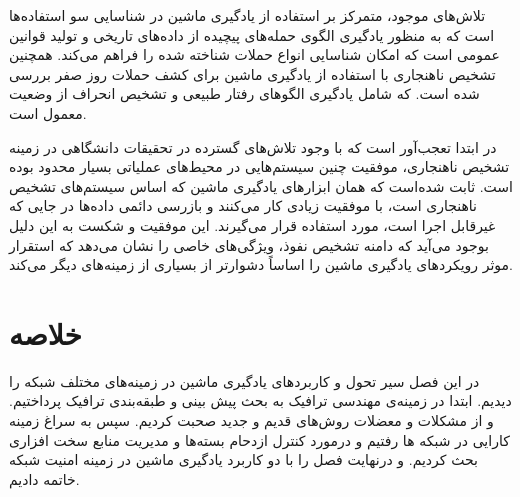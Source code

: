 تلاش‌های موجود، متمرکز بر استفاده از یادگیری ماشین در شناسایی سو استفاده‌ها است که به منظور یادگیری الگوی حمله‌های پیچیده از داده‌های تاریخی و تولید قوانین عمومی است که امکان شناسایی انواع حملات شناخته شده را فراهم می‌کند. همچنین تشخیص ناهنجاری با استفاده از یادگیری ماشین برای کشف حملات روز صفر بررسی شده است. که شامل یادگیری الگوهای رفتار طبیعی و تشخیص انحراف از وضعیت معمول است\cite{ayoubi2018machine}.


در ابتدا تعجب‌آور است که با وجود تلاش‌های گسترده در تحقیقات دانشگاهی در زمینه تشخیص ناهنجاری، موفقیت چنین سیستم‌هایی در محیط‌های عملیاتی بسیار محدود بوده است. ثابت شده‌است که همان ابزارهای یادگیری ماشین که اساس سیستم‌های تشخیص ناهنجاری است، با موفقیت زیادی کار می‌کنند و بازرسی دائمی داده‌ها در جایی که غیرقابل اجرا است، مورد استفاده قرار می‌گیرند. این موفقیت و شکست به این دلیل بوجود می‌آید که دامنه تشخیص نفوذ، ویژگی‌های خاصی را نشان می‌دهد که استقرار موثر رویکردهای یادگیری ماشین را اساساً دشوارتر از بسیاری از زمینه‌های دیگر می‌کند\cite{sommer2010outside}.


\section{خلاصه}

در این فصل سیر تحول و کاربرد‌های یادگیری ماشین در زمینه‌های مختلف شبکه را دیدیم. ابتدا در زمینه‌ی مهندسی ترافیک به بحث پیش بینی و طبقه‌بندی ترافیک پرداختیم. و از مشکلات و معضلات روش‌های قدیم و جدید صحبت کردیم. سپس به سراغ زمینه کارایی در شبکه ها رفتیم و درمورد کنترل ازدحام بسته‌ها و مدیریت منابع سخت افزاری بحث کردیم. و درنهایت فصل را با دو کاربرد یادگیری ماشین در زمینه امنیت شبکه خاتمه دادیم.





\newpage